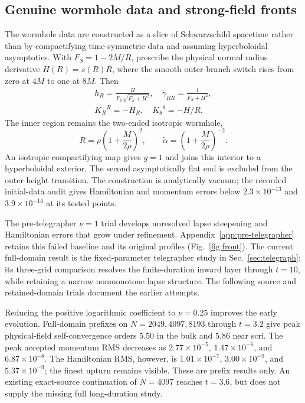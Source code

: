 \subsection{Genuine wormhole data and strong-field fronts}
\label{sec:wormhole}
The wormhole data are constructed as a slice of Schwarzschild spacetime rather than by compactifying time-symmetric data and assuming hyperboloidal asymptotics. With $F_S=1-2M/R$, prescribe the physical normal radius derivative $H(R)=s(R)R$, where the smooth outer-branch switch rises from zero at $4M$ to one at $8M$. Then
\begin{equation}
 \begin{gathered}
 h_R=\frac{H}{F_S\sqrt{F_S+H^2}},\quad
 \widetilde\gamma_{RR}=\frac1{F_S+H^2},\\
 K_R{}^R=-H_R,\quad K_\theta{}^\theta=-H/R.
 \end{gathered}
\end{equation}
The inner region remains the two-ended isotropic wormhole,
\begin{equation}
 R=\rho\left(1+\frac{M}{2\rho}\right)^2,\qquad
 \widetilde\alpha=\left(1+\frac{M}{2\rho}\right)^{-2}.
\end{equation}
An isotropic compactifying map gives $g=1$ and joins this interior to a hyperboloidal exterior. The second asymptotically flat end is excluded from the outer height transition. The construction is analytically vacuum; the recorded initial-data audit gives Hamiltonian and momentum errors below $2.3\times10^{-13}$ and $3.9\times10^{-14}$ at its tested points.

The pre-telegrapher $\nu=1$ trial develops unresolved lapse steepening and Hamiltonian errors that grow under refinement. Appendix~\ref{app:pre-telegrapher} retains this failed baseline and its original profiles (Fig.~\ref{fig:front}). The current full-domain result is the fixed-parameter telegrapher study in Sec.~\ref{sec:telegraph}: its three-grid comparison resolves the finite-duration inward layer through $t=10$, while retaining a narrow nonmonotone lapse structure. The following source and retained-domain trials document the earlier attempts.

Reducing the positive logarithmic coefficient to $\nu=0.25$ improves the early evolution. Full-domain prefixes on $N=2049,4097,8193$ through $t=3.2$ give peak physical-field self-convergence orders $5.50$ in the bulk and $5.86$ near scri. The peak accepted momentum RMS decreases as $2.77\times10^{-5}$, $1.47\times10^{-6}$, and $6.87\times10^{-8}$. The Hamiltonian RMS, however, is $1.01\times10^{-7}$, $3.00\times10^{-9}$, and $5.37\times10^{-9}$; the finest upturn remains visible. These are prefix results only. An existing exact-source continuation of $N=4097$ reaches $t=3.6$, but does not supply the missing full long-duration study.

